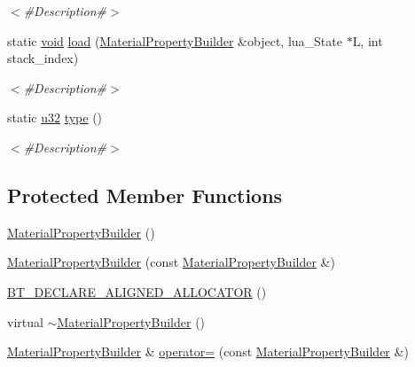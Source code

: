 \begin{DoxyCompactItemize}
\begin{DoxyCompactList}\small\item\em $<$\#\+Description\#$>$ \end{DoxyCompactList}\item 
static \mbox{\hyperlink{_thread_8h_af1e856da2e658414cb2456cb6f7ebc66}{void}} \mbox{\hyperlink{classnjli_1_1_material_property_builder_ab87af016322723607bcf6c467abd65dc}{load}} (\mbox{\hyperlink{classnjli_1_1_material_property_builder}{Material\+Property\+Builder}} \&object, lua\+\_\+\+State $\ast$L, int stack\+\_\+index)
\begin{DoxyCompactList}\small\item\em $<$\#\+Description\#$>$ \end{DoxyCompactList}\item 
static \mbox{\hyperlink{_util_8h_a10e94b422ef0c20dcdec20d31a1f5049}{u32}} \mbox{\hyperlink{classnjli_1_1_material_property_builder_a164a98bd7a61c4bfb6ce7444b981bdba}{type}} ()
\begin{DoxyCompactList}\small\item\em $<$\#\+Description\#$>$ \end{DoxyCompactList}\end{DoxyCompactItemize}
\subsection*{Protected Member Functions}
\begin{DoxyCompactItemize}
\item 
\mbox{\hyperlink{classnjli_1_1_material_property_builder_a3f4b376899bfc9219577beef4cdde52d}{Material\+Property\+Builder}} ()
\item 
\mbox{\hyperlink{classnjli_1_1_material_property_builder_a6d852e85c5d9534c2f06807d1d452c0a}{Material\+Property\+Builder}} (const \mbox{\hyperlink{classnjli_1_1_material_property_builder}{Material\+Property\+Builder}} \&)
\item 
\mbox{\hyperlink{classnjli_1_1_material_property_builder_af946f0a4dd30181c0bfc54926473d383}{B\+T\+\_\+\+D\+E\+C\+L\+A\+R\+E\+\_\+\+A\+L\+I\+G\+N\+E\+D\+\_\+\+A\+L\+L\+O\+C\+A\+T\+OR}} ()
\item 
virtual \mbox{\hyperlink{classnjli_1_1_material_property_builder_a99bd4a3a19859b9675b4f83f32ed9510}{$\sim$\+Material\+Property\+Builder}} ()
\item 
\mbox{\hyperlink{classnjli_1_1_material_property_builder}{Material\+Property\+Builder}} \& \mbox{\hyperlink{classnjli_1_1_material_property_builder_ad5ddf83cde678e5bb45cc054c48bae35}{operator=}} (const \mbox{\hyperlink{classnjli_1_1_material_property_builder}{Material\+Property\+Builder}} \&)
\end{DoxyCompactItemize}

